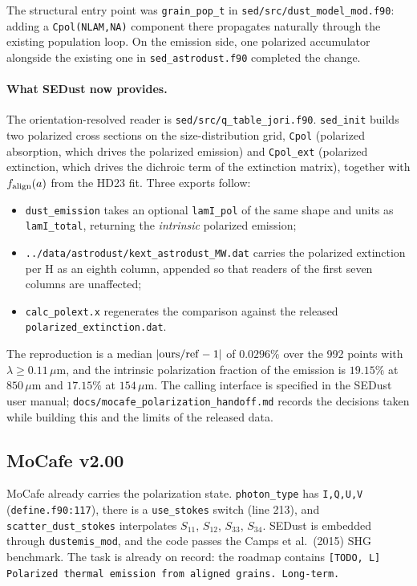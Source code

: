 \documentclass{my_memo}
\newcommand{\code}[1]{\texttt{#1}}
\newcommand{\um}{\ensuremath{\,\mu\mathrm{m}}}
\newcommand{\falign}{\ensuremath{f_{\rm align}}}
\begin{document}
The structural entry point was \code{grain\_pop\_t} in
\code{sed/src/dust\_model\_mod.f90}: adding a \code{Cpol(NLAM,NA)}
component there propagates naturally through the existing population
loop. On the emission side, one polarized accumulator alongside the
existing one in \code{sed\_astrodust.f90} completed the change.

\paragraph{What SEDust now provides.} The orientation-resolved reader is
\code{sed/src/q\_table\_jori.f90}. \code{sed\_init} builds two polarized
cross sections on the size-distribution grid, \code{Cpol} (polarized
absorption, which drives the polarized emission) and \code{Cpol\_ext}
(polarized extinction, which drives the dichroic term of the extinction
matrix), together with $\falign(a)$ from the HD23 fit. Three exports
follow:
\begin{itemize}
\item \code{dust\_emission} takes an optional \code{lamI\_pol} of the
      same shape and units as \code{lamI\_total}, returning the
      \emph{intrinsic} polarized emission;
\item \code{../data/astrodust/kext\_astrodust\_MW.dat} carries the polarized
      extinction per H as an eighth column, appended so that readers of
      the first seven columns are unaffected;
\item \code{calc\_polext.x} regenerates the comparison against the
      released \code{polarized\_extinction.dat}.
\end{itemize}
The reproduction is a median $|{\rm ours/ref}-1|$ of $0.0296\%$ over the
992 points with $\lambda \ge 0.11\um$, and the intrinsic polarization
fraction of the emission is $19.15\%$ at $850\um$ and $17.15\%$ at
$154\um$. The calling interface is specified in the SEDust user manual;
\code{docs/mocafe\_polarization\_handoff.md} records the decisions taken
while building this and the limits of the released data.

\subsection{MoCafe v2.00}

MoCafe already carries the polarization state. \code{photon\_type} has
\code{I,Q,U,V} (\code{define.f90:117}), there is a \code{use\_stokes}
switch (line 213), and \code{scatter\_dust\_stokes} interpolates
$S_{11}$, $S_{12}$, $S_{33}$, $S_{34}$. SEDust is embedded through
\code{dustemis\_mod}, and the code passes the Camps et al.\ (2015) SHG
benchmark. The task is already on record: the roadmap contains
\code{[TODO, L] Polarized thermal emission from aligned grains.
Long-term.}
\end{document}
